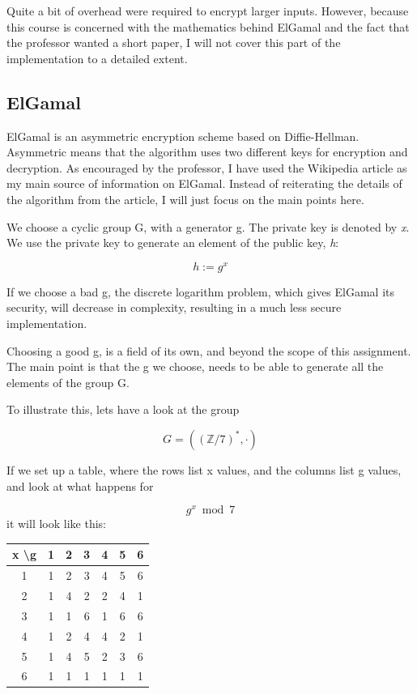 \documentclass{article}
\begin{document}
Quite a bit of overhead were required to encrypt larger inputs. However, because this course is concerned with the mathematics behind ElGamal and the fact that the professor wanted a short paper, I will not cover this part of the implementation to a detailed extent.

\subsection{ElGamal}
ElGamal is an asymmetric encryption scheme based on Diffie-Hellman. Asymmetric means that the algorithm uses two different keys for encryption and decryption. As encouraged by the professor, I have used the Wikipedia article\cite{WIKI} as my main source of information on ElGamal. Instead of reiterating the details of the algorithm from the article, I will just focus on the main points here.

We choose a cyclic group G, with a generator g. The private key is denoted by \textit{x}. We use the private key to generate an element of the public key, \textit{h}:

\begin{equation*}
h := g^{x}
\end{equation*}

If we choose a bad g, the discrete logarithm problem, which gives ElGamal its security, will decrease in complexity, resulting in a much less secure implementation.

Choosing a good g, is a field of its own, and beyond the scope of this assignment. The main point is that the g we choose, needs to be able to generate all the elements of the group G.

To illustrate this, lets have a look at the group

\begin{equation*}
  G =((\mathbb{Z}/7)^{*}, \cdot)
\end{equation*}


If we set up a table, where the rows list x values, and the columns list g values, and look at what happens for

\begin{equation*}
  g^{x} \bmod 7
\end{equation*}
it will look like this:

\begin{center}
 \begin{tabular}{||c|c c c c c c||}
 \hline
   x \textbackslash g & 1 & 2 & \textbf{3} & 4 & \textbf{5} & 6\\ [0.5ex]
 \hline
   1 & 1 & 2 & 3 & 4 & 5 & 6 \\
 \hline
   2 & 1 & 4 & 2 & 2 & 4 & 1 \\
 \hline
   3 & 1 & 1 & 6 & 1 & 6 & 6 \\
 \hline
   4 & 1 & 2 & 4 & 4 & 2 & 1 \\
 \hline
   5 & 1 & 4 & 5 & 2 & 3 & 6 \\
 \hline
   6 & 1 & 1 & 1 & 1 & 1 & 1 \\ [1ex]
 \hline
\end{tabular}
\end{center}
\end{document}
